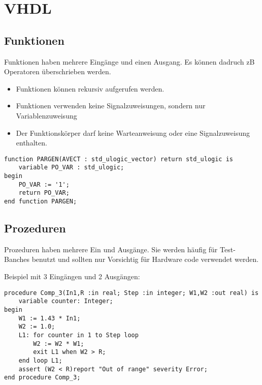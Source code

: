 \section{VHDL}
\subsection{Funktionen}
Funktionen haben mehrere Eingänge und einen Ausgang. Es können dadruch zB Operatoren überschrieben werden.
\begin{itemize}
\item Funktionen können rekursiv aufgerufen werden.
\item Funktionen verwenden keine Signalzuweisungen, sondern nur Variablenzuweisung
\item Der Funktionskörper darf keine Warteanweisung oder eine Signalzuweisung enthalten.
\end{itemize}

\begin{lstlisting}
function PARGEN(AVECT : std_ulogic_vector) return std_ulogic is
	variable PO_VAR : std_ulogic;
begin
	PO_VAR := '1';
	return PO_VAR;
end function PARGEN;
\end{lstlisting}

\subsection{Prozeduren}
Prozeduren haben mehrere Ein und Ausgänge. Sie werden häufig für Test-Banches benutzt und sollten nur Vorsichtig für Hardware code verwendet werden.

Beispiel mit 3 Eingängen und 2 Ausgängen:
\begin{lstlisting}
procedure Comp_3(In1,R :in real; Step :in integer; W1,W2 :out real) is
	variable counter: Integer;
begin
	W1 := 1.43 * In1;
	W2 := 1.0;
	L1: for counter in 1 to Step loop
		W2 := W2 * W1;
		exit L1 when W2 > R;
	end loop L1;
	assert (W2 < R)report "Out of range" severity Error;
end procedure Comp_3;
\end{lstlisting}
